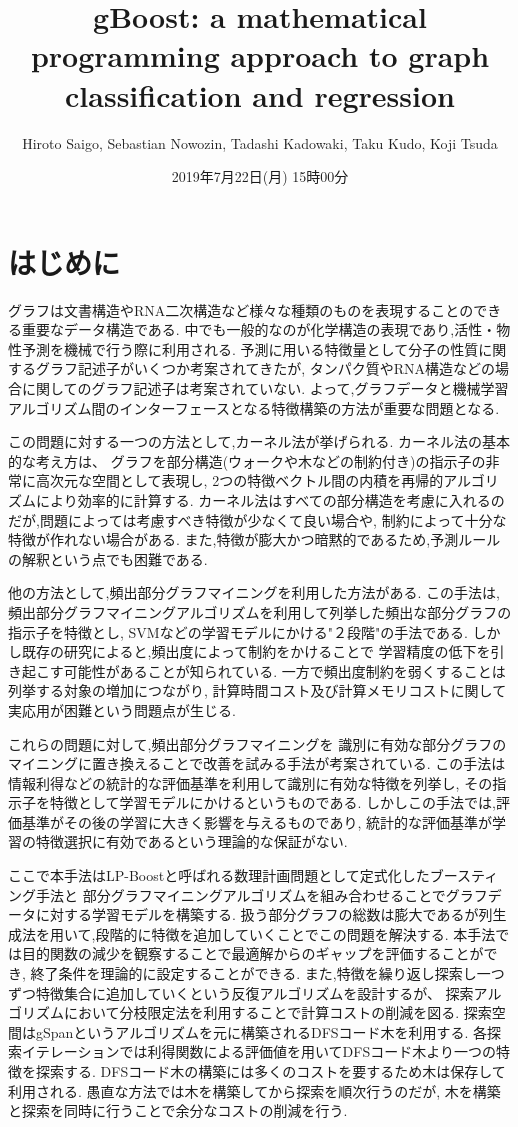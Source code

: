 \documentclass{zasshi-prml3}
\title{gBoost: a mathematical programming approach to graph classification and regression}  %
\date{2019年7月22日(月) 15時00分}      %
\author{Hiroto Saigo, Sebastian Nowozin, Tadashi Kadowaki, Taku Kudo, Koji Tsuda}    %
\begin{document}

\section{はじめに}
グラフは文書構造やRNA二次構造など様々な種類のものを表現することのできる重要なデータ構造である.
中でも一般的なのが化学構造の表現であり,活性・物性予測を機械で行う際に利用される.
予測に用いる特徴量として分子の性質に関するグラフ記述子がいくつか考案されてきたが,
タンパク質やRNA構造などの場合に関してのグラフ記述子は考案されていない.
よって,グラフデータと機械学習アルゴリズム間のインターフェースとなる特徴構築の方法が重要な問題となる.

この問題に対する一つの方法として,カーネル法が挙げられる.
カーネル法の基本的な考え方は、
グラフを部分構造(ウォークや木などの制約付き)の指示子の非常に高次元な空間として表現し,
2つの特徴ベクトル間の内積を再帰的アルゴリズムにより効率的に計算する.
カーネル法はすべての部分構造を考慮に入れるのだが,問題によっては考慮すべき特徴が少なくて良い場合や,
制約によって十分な特徴が作れない場合がある.
また,特徴が膨大かつ暗黙的であるため,予測ルールの解釈という点でも困難である.

他の方法として,頻出部分グラフマイニングを利用した方法がある.
この手法は,頻出部分グラフマイニングアルゴリズムを利用して列挙した頻出な部分グラフの指示子を特徴とし,
SVMなどの学習モデルにかける"２段階"の手法である.
しかし既存の研究によると,頻出度によって制約をかけることで
学習精度の低下を引き起こす可能性があることが知られている.
一方で頻出度制約を弱くすることは列挙する対象の増加につながり,
計算時間コスト及び計算メモリコストに関して実応用が困難という問題点が生じる.

これらの問題に対して,頻出部分グラフマイニングを
識別に有効な部分グラフのマイニングに置き換えることで改善を試みる手法が考案されている.
この手法は情報利得などの統計的な評価基準を利用して識別に有効な特徴を列挙し,
その指示子を特徴として学習モデルにかけるというものである.
しかしこの手法では,評価基準がその後の学習に大きく影響を与えるものであり,
統計的な評価基準が学習の特徴選択に有効であるという理論的な保証がない.

ここで本手法はLP-Boostと呼ばれる数理計画問題として定式化したブースティング手法と
部分グラフマイニングアルゴリズムを組み合わせることでグラフデータに対する学習モデルを構築する.
扱う部分グラフの総数は膨大であるが列生成法を用いて,段階的に特徴を追加していくことでこの問題を解決する.
本手法では目的関数の減少を観察することで最適解からのギャップを評価することができ,
終了条件を理論的に設定することができる.
また,特徴を繰り返し探索し一つずつ特徴集合に追加していくという反復アルゴリズムを設計するが、
探索アルゴリズムにおいて分枝限定法を利用することで計算コストの削減を図る.
探索空間はgSpanというアルゴリズムを元に構築されるDFSコード木を利用する.
各探索イテレーションでは利得関数による評価値を用いてDFSコード木より一つの特徴を探索する.
DFSコード木の構築には多くのコストを要するため木は保存して利用される.
愚直な方法では木を構築してから探索を順次行うのだが,
木を構築と探索を同時に行うことで余分なコストの削減を行う.
\end{document}

